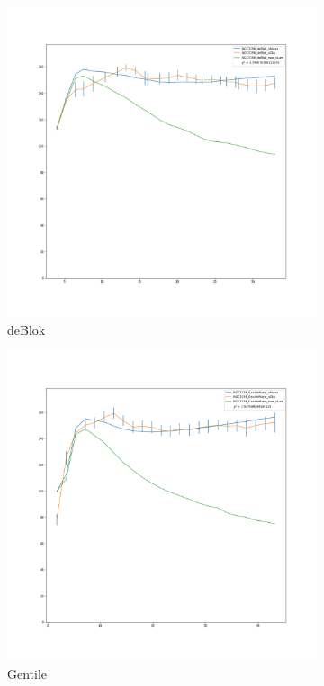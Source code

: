\documentclass[reprint,%
 amsmath,amssymb,
 aps,
]{revtex4-1}
\begin{document}
\clearpage
  \begin{figure}[h]
\begin{subfigure}{.5\textwidth}
  \centering
  \includegraphics[width=.8\linewidth]{NGC3198_deBlok_XueSofue}
  \caption{deBlok \cite{Blok}}
  \label{fig:sfig6}
\end{subfigure}%
\begin{subfigure}{.5\textwidth}
  \centering
  \includegraphics[width=.8\linewidth]{NGC3198_GentileMaria_XueSofue}
  \caption{Gentile \cite{Maria}}
  \label{fig:sfig7}
\end{subfigure}
\begin{subfigure}{.5\textwidth}

\end{subfigure}
\end{figure}
\end{document}
